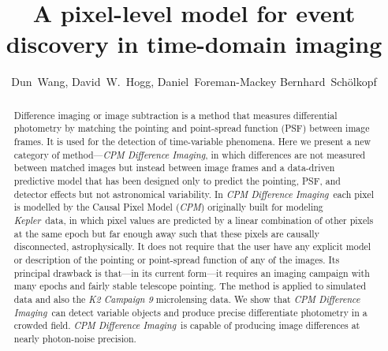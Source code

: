 \documentclass[12pt, preprint]{aastex}
\newcommand{\project}[1]{\textsl{#1}}
\newcommand{\cpm}{\project{CPM}}
\newcommand{\cpmdiff}{\project{CPM Difference Imaging}}
\newcommand{\kepler}{\project{Kepler}}
\begin{document}
\title{A pixel-level model for event discovery in time-domain imaging}
\author{%
  Dun~Wang\altaffilmark{\ref{CCPP},\ref{email}},
  David~W.~Hogg\altaffilmark{\ref{CCPP},\ref{CDS},\ref{MPIA},\ref{FI}},
  Daniel~Foreman-Mackey\altaffilmark{\ref{UW},\ref{SF}}
  Bernhard~Sch\"olkopf\altaffilmark{\ref{MPIIS}}
  }
\setcounter{address}{1}


\begin{abstract}
Difference imaging or image subtraction is a method that measures differential photometry by matching the pointing and point-spread function (PSF) between image frames. 
It is used for the detection of time-variable phenomena.
Here we present a new category of method---\cpmdiff, in which differences are not measured between matched images but instead between image frames and a data-driven predictive model that has been designed only to predict the pointing, PSF, and detector effects but not astronomical variability. 
In \cpmdiff\ each pixel is modelled by the Causal Pixel Model (\cpm) originally built for modeling \kepler\ data, in which pixel values are predicted by a linear combination of other pixels at the same epoch but far enough away such that these pixels are causally disconnected, astrophysically. 
It does not require that the user have any explicit model or description of the pointing or point-spread function of any of the images.
Its principal drawback is that---in its current form---it requires an imaging campaign with many epochs and fairly stable telescope pointing.
The method is applied to simulated data and also the \project{K2 Campaign 9} microlensing data. 
We show that \cpmdiff\ can detect variable objects and produce precise differentiate photometry in a crowded field.
\cpmdiff\ is capable of producing image differences at nearly photon-noise precision. 
\end{abstract}
\end{document}
